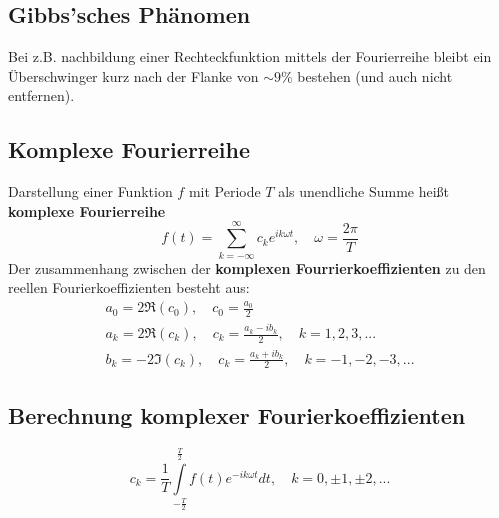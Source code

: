 \documentclass[12pt]{article}
\begin{document}
\subsection{Gibbs'sches Phänomen}
Bei z.B. nachbildung einer Rechteckfunktion mittels der Fourierreihe bleibt ein Überschwinger kurz nach der Flanke von $\sim 9\%$ bestehen (und auch nicht entfernen).
\subsection{Komplexe Fourierreihe}
Darstellung einer Funktion $f$ mit Periode $T$ als unendliche Summe heißt \textbf{komplexe Fourierreihe}
\begin{equation*}
	f(t) = \sum\limits_{k=-\infty}^{\infty}c_ke^{ik\omega t}, \quad \omega=\frac{2\pi}{T}
\end{equation*}
Der zusammenhang zwischen der \textbf{komplexen Fourrierkoeffizienten} zu den reellen Fourierkoeffizienten besteht aus:
\begin{gather*}
	a_0=2\Re(c_0), \quad c_0=\frac{a_0}{2}\\
	a_k=2\Re(c_k), \quad c_k=\frac{a_k-ib_k}{2}, \quad k=1,2,3,...\\
	b_k=-2\Im(c_k), \quad c_k=\frac{a_k+ib_k}{2}, \quad k=-1,-2,-3,...
\end{gather*}
\subsection{Berechnung komplexer Fourierkoeffizienten}
\begin{equation*}
	c_k=\frac{1}{T}\int\limits_{-\frac{T}{2}}^{\frac{T}{2}}f(t)e^{-ik\omega t}dt, \quad k=0,\pm1,\pm2,...
\end{equation*}
\end{document}
